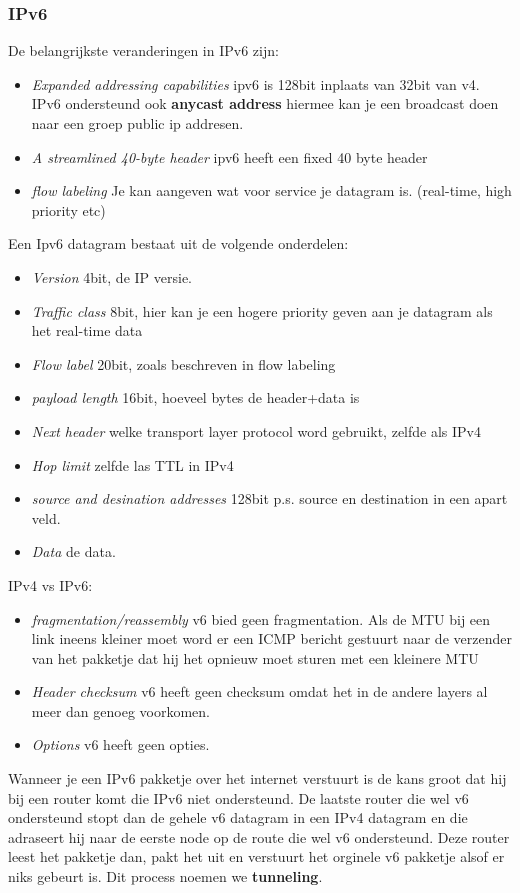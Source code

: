 \subsubsection{IPv6}
De belangrijkste veranderingen in IPv6 zijn:
\begin{itemize}
    \item \textit{Expanded addressing capabilities} ipv6 is 128bit inplaats van 32bit van v4. IPv6 ondersteund ook
    \textbf{anycast address} hiermee kan je een broadcast doen naar een groep public ip addresen.
    \item \textit{A streamlined 40-byte header} ipv6 heeft een fixed 40 byte header
    \item \textit{flow labeling} Je kan aangeven wat voor service je datagram is. (real-time, high priority etc)
\end{itemize}
Een Ipv6 datagram bestaat uit de volgende onderdelen:
\begin{itemize}
    \item \textit{Version} 4bit, de IP versie.
    \item \textit{Traffic class} 8bit, hier kan je een hogere priority geven aan je datagram als het real-time data
    \item \textit{Flow label} 20bit, zoals beschreven in flow labeling
    \item \textit{payload length} 16bit, hoeveel bytes de header+data is
    \item \textit{Next header} welke transport layer protocol word gebruikt, zelfde als IPv4
    \item \textit{Hop limit} zelfde las TTL in IPv4
    \item \textit{source and desination addresses} 128bit p.s. source en destination in een apart veld.
    \item \textit{Data} de data.
\end{itemize}
IPv4 vs IPv6:
\begin{itemize}
    \item \textit{fragmentation/reassembly} v6 bied geen fragmentation. Als de MTU bij een link ineens kleiner moet
    word er een ICMP bericht gestuurt naar de verzender van het pakketje dat hij het opnieuw moet sturen met een
    kleinere MTU
    \item \textit{Header checksum} v6 heeft geen checksum omdat het in de andere layers al meer dan genoeg voorkomen.
    \item \textit{Options} v6 heeft geen opties.
\end{itemize}
Wanneer je een IPv6 pakketje over het internet verstuurt is de kans groot dat hij bij een router komt die IPv6 niet
ondersteund. De laatste router die wel v6 ondersteund stopt dan de gehele v6 datagram in een IPv4 datagram en die
adraseert hij naar de eerste node op de route die wel v6 ondersteund. Deze router leest het pakketje dan, pakt het
uit en verstuurt het orginele v6 pakketje alsof er niks gebeurt is. Dit process noemen we \textbf{tunneling}.